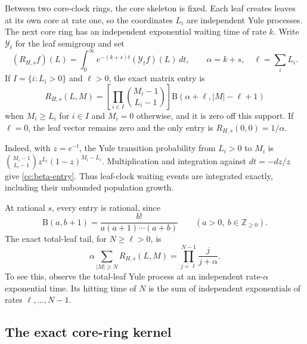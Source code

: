 Between two core-clock rings, the core skeleton is fixed. Each leaf
creates leaves at its own core at rate one, so the coordinates $L_i$
are independent Yule processes. The next core ring has an independent
exponential waiting time of rate $k$. Write $\mathcal Y_t$ for the
leaf semigroup and set
\begin{equation}\label{cc:R-def}
 (R_{H,s}f)(L)=\int_0^\infty e^{-(k+s)t}(\mathcal Y_t f)(L)\,dt,
 \qquad \alpha=k+s,\quad \ell=\sum_iL_i.
\end{equation}
If $I=\{i:L_i>0\}$ and $\ell>0$, the exact matrix entry is
\begin{equation}\label{cc:beta-entry}
 R_{H,s}(L,M)=
 \left[\prod_{i\in I}\binom{M_i-1}{L_i-1}\right]
 \mathrm B(\alpha+\ell,|M|-\ell+1)
\end{equation}
when $M_i\ge L_i$ for $i\in I$ and $M_i=0$ otherwise, and it is zero
off this support. If $\ell=0$, the leaf vector remains zero and the
only entry is $R_{H,s}(0,0)=1/\alpha$.

Indeed, with $z=e^{-t}$, the Yule transition probability from $L_i>0$
to $M_i$ is
$\binom{M_i-1}{L_i-1}z^{L_i}(1-z)^{M_i-L_i}$.
Multiplication and integration against $dt=-dz/z$ give
\eqref{cc:beta-entry}. Thus leaf-clock waiting events are integrated
exactly, including their unbounded population growth.

At rational $s$, every entry is rational, since
\[
 \mathrm B(a,b+1)=\frac{b!}{a(a+1)\cdots(a+b)}
 \qquad(a>0,\ b\in\mathbb Z_{\ge0}).
\]
The exact total-leaf tail, for $N\ge\ell>0$, is
\begin{equation}\label{cc:exact-tail}
 \alpha\sum_{|M|\ge N}R_{H,s}(L,M)
 =\prod_{j=\ell}^{N-1}\frac{j}{j+\alpha}.
\end{equation}
To see this, observe the total-leaf Yule process at an independent
rate-$\alpha$ exponential time. Its hitting time of $N$ is the sum
of independent exponentials of rates $\ell,\ldots,N-1$.

\subsection{The exact core-ring kernel}

